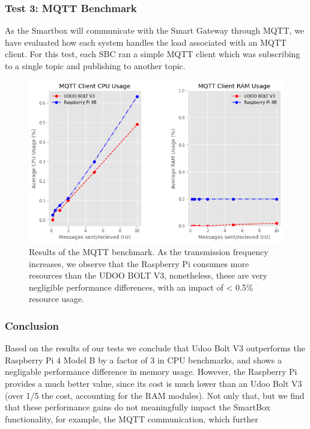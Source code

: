 \subsubsection{Test 3: \acs{MQTT} Benchmark}
As the Smartbox will communicate with the Smart Gateway through \acs{MQTT}, we have evaluated how each system handles the load associated with an MQTT client. For this test, each \acs{SBC} ran a simple \acs{MQTT} client which was subscribing to a single topic and publishing to another topic.

\begin{figure}[H]
    \centering
    \includegraphics[width=\linewidth]{images/mqtt_test_results.png}
    \caption{Results of the MQTT benchmark. As the transmission frequency increases, we observe that the Raspberry Pi consumes more resources than the UDOO BOLT V3, nonetheless, these are very negligible performance differences, with an impact of < 0.5\% resource usage.}
    \label{fig:mqtt-tests}
\end{figure}

\subsubsection{Conclusion}

Based on the results of our tests we conclude that Udoo Bolt V3 outperforms the Raspberry Pi 4 Model B by a factor of 3 in CPU benchmarks, and shows a negligable performance difference in memory usage. However, the Raspberry Pi provides a much better value, since its cost is much lower than an Udoo Bolt V3 (over 1/5 the cost, accounting for the RAM modules). Not only that, but we find that these performance gains do not meaningfully impact the SmartBox functionality, for example, the MQTT communication, which further 

